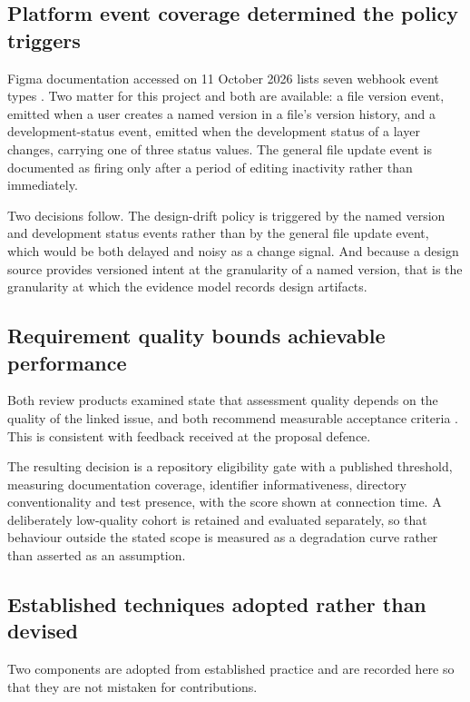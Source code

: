 \subsection{Platform event coverage determined the policy triggers}

Figma documentation accessed on 11 October 2026 lists seven webhook event types
\cite{figmawebhooks}. Two matter for this project and both are available: a file
version event, emitted when a user creates a named version in a file's version
history, and a development-status event, emitted when the development status of
a layer changes, carrying one of three status values. The general file update
event is documented as firing only after a period of editing inactivity rather
than immediately.

Two decisions follow. The design-drift policy is triggered by the named version
and development status events rather than by the general file update event,
which would be both delayed and noisy as a change signal. And because a design
source provides versioned intent at the granularity of a named version, that is
the granularity at which the evidence model records design artifacts.

\subsection{Requirement quality bounds achievable performance}

Both review products examined state that assessment quality depends on the
quality of the linked issue, and both recommend measurable acceptance criteria
\cite{coderabbitdocs, rovodocs}. This is consistent with feedback received at
the proposal defence.

The resulting decision is a repository eligibility gate with a published
threshold, measuring documentation coverage, identifier informativeness,
directory conventionality and test presence, with the score shown at connection
time. A deliberately low-quality cohort is retained and evaluated separately, so
that behaviour outside the stated scope is measured as a degradation curve
rather than asserted as an assumption.

\subsection{Established techniques adopted rather than devised}

Two components are adopted from established practice and are recorded here so
that they are not mistaken for contributions.

